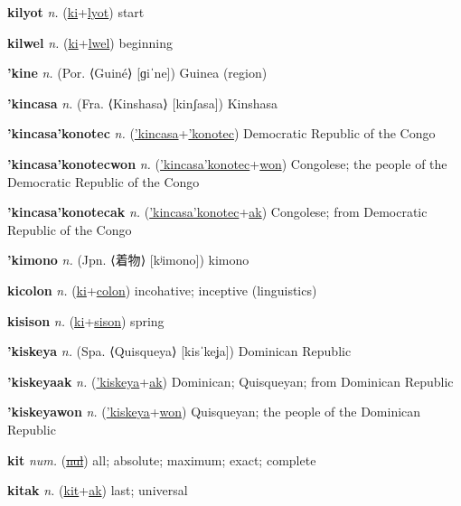 \textbf{\hypertarget{kilyot}{kilyot}} \textit{n.} (\hyperlink{ki}{ki}+\allowbreak \hyperlink{lyot}{lyot})
start

\textbf{\hypertarget{kilwel}{kilwel}} \textit{n.} (\hyperlink{ki}{ki}+\allowbreak \hyperlink{lwel}{lwel})
beginning

\textbf{\hypertarget{'kine}{'kine}} \textit{n.} (Por. ⟨Guiné⟩ [ɡiˈne])
Guinea (region)

\textbf{\hypertarget{'kincasa}{'kincasa}} \textit{n.} (Fra. ⟨Kinshasa⟩ [kinʃasa])
Kinshasa

\textbf{\hypertarget{'kincasa'konotec}{'kincasa'konotec}} \textit{n.} (\hyperlink{'kincasa}{'kincasa}+\allowbreak \hyperlink{'konotec}{'konotec})
Democratic Republic of the Congo

\textbf{\hypertarget{'kincasa'konotecwon}{'kincasa'konotecwon}} \textit{n.} (\hyperlink{'kincasa'konotec}{'kincasa'konotec}+\allowbreak \hyperlink{won}{won})
Congolese; the people of the Democratic Republic of the Congo

\textbf{\hypertarget{'kincasa'konotecak}{'kincasa'konotecak}} \textit{n.} (\hyperlink{'kincasa'konotec}{'kincasa'konotec}+\allowbreak \hyperlink{ak}{ak})
Congolese; from Democratic Republic of the Congo

\textbf{\hypertarget{'kimono}{'kimono}} \textit{n.} (Jpn. ⟨{\japanese{}着物}⟩ [kʲimono])
kimono

\textbf{\hypertarget{kicolon}{kicolon}} \textit{n.} (\hyperlink{ki}{ki}+\allowbreak \hyperlink{colon}{colon})
incohative; inceptive (linguistics)

\textbf{\hypertarget{kisison}{kisison}} \textit{n.} (\hyperlink{ki}{ki}+\allowbreak \hyperlink{sison}{sison})
spring

\textbf{\hypertarget{'kiskeya}{'kiskeya}} \textit{n.} (Spa. ⟨Quisqueya⟩ [kisˈkeʝa])
Dominican Republic

\textbf{\hypertarget{'kiskeyaak}{'kiskeyaak}} \textit{n.} (\hyperlink{'kiskeya}{'kiskeya}+\allowbreak \hyperlink{ak}{ak})
Dominican; Quisqueyan; from Dominican Republic

\textbf{\hypertarget{'kiskeyawon}{'kiskeyawon}} \textit{n.} (\hyperlink{'kiskeya}{'kiskeya}+\allowbreak \hyperlink{won}{won})
Quisqueyan; the people of the Dominican Republic

\textbf{\hypertarget{kit}{kit}} \textit{num.} (\hyperlink{nul}{\sout{nul}})
all; absolute; maximum; exact; complete

\textbf{\hypertarget{kitak}{kitak}} \textit{n.} (\hyperlink{kit}{kit}+\allowbreak \hyperlink{ak}{ak})
last; universal


